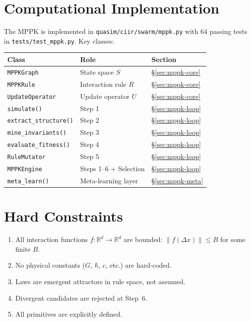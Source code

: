 \section{Computational Implementation}
\label{sec:mppk-code}

The MPPK is implemented in
\texttt{quasim/ciir/swarm/mppk.py}
with 64 passing tests in
\texttt{tests/test\_mppk.py}.
Key classes:

\begin{center}
\begin{tabular}{lll}
\toprule
\textbf{Class} & \textbf{Role} & \textbf{Section} \\
\midrule
\texttt{MPPKGraph}      & State space $S$       & \S\ref{sec:mppk-core} \\
\texttt{MPPKRule}        & Interaction rule $R$  & \S\ref{sec:mppk-core} \\
\texttt{UpdateOperator}  & Update operator $U$   & \S\ref{sec:mppk-core} \\
\texttt{simulate()}      & Step 1                & \S\ref{sec:mppk-loop} \\
\texttt{extract\_structure()} & Step 2           & \S\ref{sec:mppk-loop} \\
\texttt{mine\_invariants()}   & Step 3           & \S\ref{sec:mppk-loop} \\
\texttt{evaluate\_fitness()}  & Step 4           & \S\ref{sec:mppk-loop} \\
\texttt{RuleMutator}     & Step 5                & \S\ref{sec:mppk-loop} \\
\texttt{MPPKEngine}      & Steps 1--6 + Selection & \S\ref{sec:mppk-loop} \\
\texttt{meta\_learn()}   & Meta-learning layer   & \S\ref{sec:mppk-meta} \\
\bottomrule
\end{tabular}
\end{center}

\section{Hard Constraints}
\label{sec:mppk-constraints}

\begin{enumerate}[nosep]
  \item All interaction functions $f\colon\mathbb{R}^d\to\mathbb{R}^d$
        are bounded: $\|f(\Delta x)\|\le B$ for some finite $B$.
  \item No physical constants ($G$, $\hbar$, $c$, etc.) are hard-coded.
  \item Laws are emergent attractors in rule space, not assumed.
  \item Divergent candidates are rejected at Step~6.
  \item All primitives are explicitly defined.
\end{enumerate}

